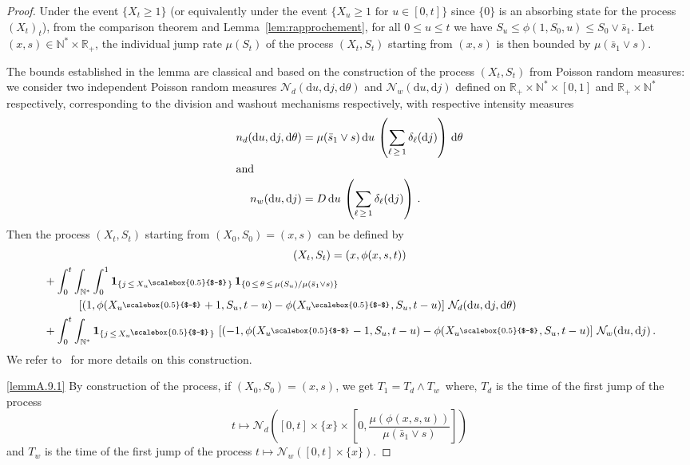 \documentclass[AHL,Unicode,longabstracts,published]{cedram}
\newcommand{\RR}{\mathbb{R}}
\newcommand{\NN}{\mathbb{N}}
\newcommand{\clN}{\mathcal{N}}
\newcommand{\umoins}{{\smash{u^{\raisebox{-1pt}{\scriptsize\scalebox{0.5}{$-$}}}}}}
\newcommand{\dif}{\mathrm{d}}
\newcommand{\1}{\mathbf{1}}
\begin{document}
\begin{proof}
Under the event $\{X_t\geq 1\}$ (or equivalently under the event $\{X_u\geq 1 \text{ for } u \in [0, t]\}$ since $\{0\}$ is an absorbing state for the process $(X_t)_t$), from the comparison theorem and Lemma~\ref{lem:rapprochement}, for all $0\leq u \leq t$ we have $S_u \leq \phi(1,S_0,u)\leq S_0\vee \bar s_1$. Let $(x,s) \in \NN^*\times \RR_+$, the individual jump rate $\mu(S_t)$ of the process $(X_t,S_t)$ starting from $(x,s)$ is then bounded by $\mu(\bar s_1\vee s)$.


The bounds established in the lemma are classical and based on the construction of the process $(X_t,S_t)$ from Poisson random measures: we consider two independent Poisson random measures $\clN _d(\dif u, \dif j, \dif \theta)$ and $\clN _w(\dif u, \dif j)$ defined on $\RR_+ \times \NN^* \times [0,1]$ and $\RR_+ \times \NN^*$ respectively, corresponding to the division and washout mechanisms respectively, with respective intensity measures
\begin{align*}
n_d(\dif u, \dif j, \dif \theta) &=
\mu(\bar s_1 \vee s) \, \dif u \, \left(\sum_{\ell\,\geq\,1} \delta_{\ell}(\dif j) \right)
\, \dif \theta\\
\intertext{and}
n_w(\dif u, \dif j) &= D \, \dif u \, \left(\sum_{\ell\,\geq\,1} \delta_{\ell}(\dif j) \right)\,.
\end{align*}
Then the process $(X_t,S_t)$ starting from $(X_0,S_0)=(x,s)$ can be defined by
\begin{multline*}
(X_t,S_t) = (x, \phi(x,s,t))\\
\begin{aligned}
&+ \int_0^t \int_{\NN^*} \int_0^1 \1_{\left\{j\,\leq\,X_{\umoins}\right\}}\,\1_{\left\{0\,\leq\,\theta \,\leq\,\mu(S_u)/\mu(\bar s_1 \vee s)\right\}}\,\\
& \qquad \quad
\left[(1, \phi(X_\umoins +1, S_u, t-u)- \phi(X_\umoins, S_u, t-u)\right]\,\clN _d(\dif u, \dif j, \dif \theta)
\\
&+ \int_0^t \int_{\NN^*} \1_{\left\{j\,\leq\,X_{\umoins}\right\}}\,
\left[(-1, \phi(X_\umoins -1, S_u, t-u)- \phi(X_\umoins, S_u, t-u)\right]\,\clN _w(\dif u, \dif j)\,.
\end{aligned}
\end{multline*}
We refer to~\cite{CF15} for more details on this construction.

\eqref{lemmA.9.1} By construction of the process, if $(X_0,S_0)=(x,s)$, we get $T_1 = T_{d}\wedge T_{w}\,$ where, $T_{d}$ is the time of the first jump of the process
\[
t\mapsto \clN _{d}\left([0,t]\times \{x\}\times \left[0,\frac{\mu(\phi(x,s,u))}{\mu(\bar s_1 \vee s)}\right] \right)
\]
and $T_{w}$ is the time of the first jump of the process $t\mapsto \clN _{w}([0,t]\times \{x\})$.


\end{proof}
\end{document}
